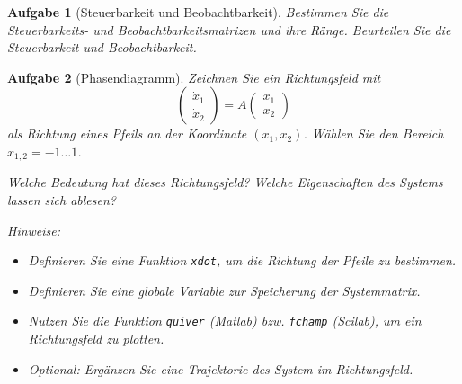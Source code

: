 \documentclass[11pt,a4paper,headsepline]{scrartcl}
\newtheorem{aufgabe}{Aufgabe}
\begin{document}
\begin{aufgabe}[Steuerbarkeit und Beobachtbarkeit]
\label{Task:ContObs}
Bestimmen Sie die Steuerbarkeits- und Beobachtbarkeitsmatrizen und ihre R\"ange. Beurteilen Sie die Steuerbarkeit und Beobachtbarkeit.
\end{aufgabe}
\vspace{0.5cm}
\begin{aufgabe}[Phasendiagramm]
\label{Task:Phase}
Zeichnen Sie ein Richtungsfeld mit
\begin{equation*}
\begin{pmatrix}
 \dot{x}_{1} \\  \dot{x}_{2}
\end{pmatrix} = A 
\begin{pmatrix}
 {x}_{1} \\  {x}_{2}
\end{pmatrix}
\end{equation*}
als Richtung eines Pfeils an der Koordinate $\left(x_{1}, x_{2} \right)$. W\"ahlen Sie den Bereich $x_{1,2} = -1 \ldots 1$.

Welche Bedeutung hat dieses Richtungsfeld? Welche Eigenschaften des Systems lassen sich ablesen?

Hinweise:
\begin{itemize}
	\item Definieren Sie eine Funktion \texttt{xdot}, um die Richtung der Pfeile zu bestimmen.
	\item Definieren Sie eine globale Variable zur Speicherung der Systemmatrix.
	\item Nutzen Sie die Funktion  \texttt{quiver} (Matlab) bzw. \texttt{fchamp} (Scilab), um ein Richtungsfeld zu plotten.
	\item Optional: Erg\"anzen Sie eine Trajektorie des System im Richtungsfeld.
\end{itemize}
\end{aufgabe}
\end{document}
